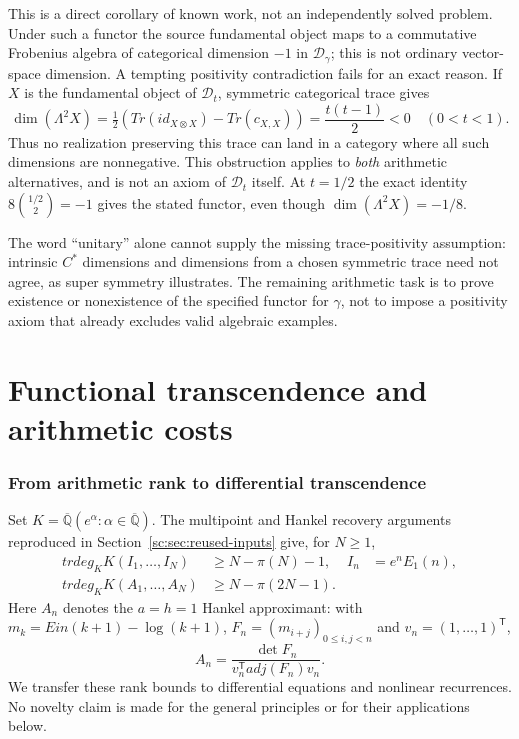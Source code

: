 \documentclass[11pt,a4paper]{article}
\theoremstyle{definition}
\theoremstyle{remark}
\theoremstyle{plain}
\numberwithin{equation}{section}
\def\operatorname#1{#1}\def\mathrm#1{#1}}
\begin{document}
This is a direct corollary of known work, not an independently solved
problem. Under such a functor the source fundamental object maps to a
commutative Frobenius algebra of categorical dimension $-1$ in
$\mathcal D_\gamma$; this is not ordinary vector-space dimension.
A tempting positivity contradiction fails for an exact reason.
If $X$ is the fundamental object of $\mathcal D_t$, symmetric categorical
trace gives
\[
 \dim(\Lambda^2X)
 =\tfrac12\left(\operatorname{Tr}(\mathrm{id}_{X\otimes X})
                 -\operatorname{Tr}(c_{X,X})\right)
 =\frac{t(t-1)}2<0\quad(0<t<1).
\]
Thus no realization preserving this trace can land in a category where
all such dimensions are nonnegative. This obstruction applies to
\emph{both} arithmetic alternatives, and is not an axiom of
$\mathcal D_t$ itself. At $t=1/2$ the exact identity
$8\binom{1/2}{2}=-1$ gives the stated functor, even though
$\dim(\Lambda^2X)=-1/8$.

The word ``unitary'' alone cannot supply the missing trace-positivity
assumption: intrinsic $C^*$ dimensions and dimensions from a chosen
symmetric trace need not agree, as super symmetry illustrates.
The remaining arithmetic task is to prove existence or nonexistence
of the specified functor for $\gamma$, not to impose a positivity
axiom that already excludes valid algebraic examples.


\clearpage
\part{Functional transcendence and arithmetic costs}

\section{From arithmetic rank to differential transcendence}
\label{sc:sec:independence-dynamics}

Set $K=\overline{\mathbb Q}(e^\alpha:\alpha\in\overline{\mathbb Q})$.
The multipoint and Hankel recovery arguments reproduced in
Section~\ref{sc:sec:reused-inputs} give, for $N\ge1$,
\begin{align}
 \operatorname{trdeg}_K K(I_1,\ldots,I_N)&\ge N-\pi(N)-1,
 &I_n&=e^nE_1(n),\label{sc:dyn:I-rank}\\
 \operatorname{trdeg}_K K(A_1,\ldots,A_N)&\ge N-\pi(2N-1).
 \label{sc:dyn:A-rank}
\end{align}
Here $A_n$ denotes the $a=h=1$ Hankel approximant: with
$m_k=\operatorname{Ein}(k+1)-\log(k+1)$,
$F_n=(m_{i+j})_{0\le i,j<n}$ and $v_n=(1,\ldots,1)^{\mathsf T}$,
\[
 A_n=\frac{\det F_n}{v_n^{\mathsf T}\operatorname{adj}(F_n)v_n}.
\]
We transfer these rank bounds to differential equations and nonlinear
recurrences. No novelty claim is made for the general principles or
for their applications below.
\end{document}
